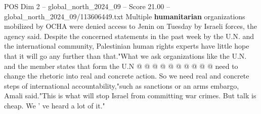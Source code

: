 \begin{textsample}{POS Dim 2 – global\_north\_2024\_09 – Score 21.00 – global\_north\_2024\_09/113606449.txt}
Multiple \textbf{humanitarian} organizations mobilized by OCHA were denied access to Jenin on Tuesday by Israeli forces, the agency said.
Despite the concerned statements in the past week by the U.N. and the international community, Palestinian human rights experts have little hope that it will go any further than that."What we ask organizations like the U.N. and the member states that form the U.N @ @ @ @ @ @ @ @ @ @ need to change the rhetoric into real and concrete action.
So we need real and concrete steps of international accountability,"such as sanctions or an arms embargo, Amali said."This is what will stop Israel from committing war crimes.
But talk is cheap.
We ' ve heard a lot of it."

\end{textsample}
